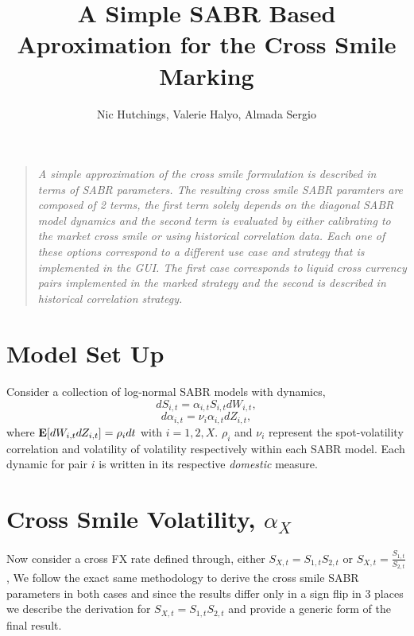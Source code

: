 \documentclass[12pt]{article}
\title{A Simple SABR Based Aproximation for the Cross Smile Marking}
\author{Nic Hutchings, Valerie Halyo, Almada Sergio}
\newenvironment{sciabstract}{%
\begin{quote} \it}
{\end{quote}}
\begin{document}
\baselineskip24pt
\maketitle

\begin{sciabstract}
      A simple approximation of the  cross smile formulation is described in terms of SABR parameters.
      The resulting cross smile SABR paramters are composed of 2 terms, the first term  solely depends on the diagonal
      SABR model dynamics and the second term  is evaluated by either calibrating to the market cross smile or using
      historical correlation data. Each one of these options correspond to a different use case and strategy that is implemented
      in the GUI. The first case corresponds to liquid cross currency pairs implemented in the marked strategy and the second is described
      in historical correlation strategy.
      

\end{sciabstract}

\section{Model Set Up}
\paragraph*{}
Consider a collection of log-normal SABR models with dynamics,
$$dS_{i,t} = \alpha_{i,t}S_{i,t}dW_{i,t},$$
$$d\alpha_{i,t} = \nu_i\alpha_{i,t}dZ_{i,t},$$
where ${\bf E}[dW_{i,t}dZ_{i,t}] = \rho_idt$ with $i = 1,2,X.$ $\rho_i$ and $\nu_i$ represent the spot-volatility correlation and volatility of volatility respectively within each SABR model. Each dynamic for pair $i$ is written in its respective {\it domestic} measure.

\section{Cross Smile Volatility, $\alpha_X$}
\paragraph*{}
Now consider a cross FX rate defined through, either $S_{X,t} = S_{1,t}S_{2,t}$ or   $S_{X,t} = \frac{S_{1,t}}{S_{2,t}}$,  
We follow the exact same methodology to derive the cross smile SABR parameters in both cases and since the results differ only in a sign flip
in 3 places we describe the derivation for  $S_{X,t} = S_{1,t}S_{2,t}$ and provide a generic form of the final result.
\end{document}
